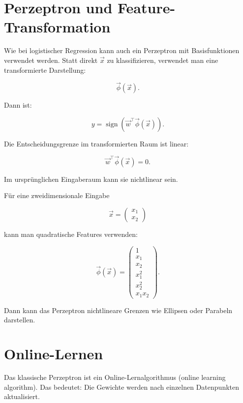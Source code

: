 \section{Perzeptron und Feature-Transformation}

Wie bei logistischer Regression kann auch ein Perzeptron mit Basisfunktionen verwendet werden.
Statt direkt \(\vec{x}\) zu klassifizieren, verwendet man eine transformierte Darstellung:

\[
    \vec{\phi}(\vec{x}).
\]

Dann ist:

\[
    y
    =
    \operatorname{sign}
    \left(
        \vec{w}^{\top}\vec{\phi}(\vec{x})
    \right).
\]

Die Entscheidungsgrenze im transformierten Raum ist linear:

\[
    \vec{w}^{\top}\vec{\phi}(\vec{x})=0.
\]

Im ursprünglichen Eingaberaum kann sie nichtlinear sein.

\begin{examplebox}
Für eine zweidimensionale Eingabe

\[
    \vec{x}
    =
    \begin{pmatrix}
        x_1 \\
        x_2
    \end{pmatrix}
\]

kann man quadratische Features verwenden:

\[
    \vec{\phi}(\vec{x})
    =
    \begin{pmatrix}
        1 \\
        x_1 \\
        x_2 \\
        x_1^2 \\
        x_2^2 \\
        x_1x_2
    \end{pmatrix}.
\]

Dann kann das Perzeptron nichtlineare Grenzen wie Ellipsen oder Parabeln darstellen.
\end{examplebox}

\section{Online-Lernen}

Das klassische Perzeptron ist ein Online-Lernalgorithmus (online learning algorithm).
Das bedeutet:
Die Gewichte werden nach einzelnen Datenpunkten aktualisiert.

